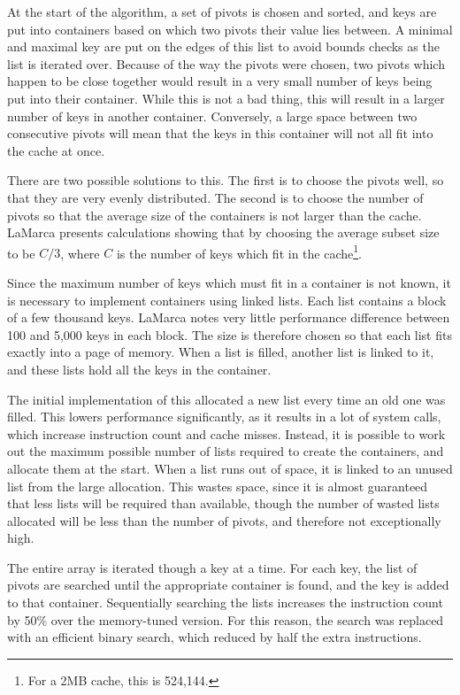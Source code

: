 At the start of the algorithm, a set of pivots is chosen and sorted, and keys
are put into containers based on which two pivots their value lies between. A
minimal and maximal key are put on the edges of this list to avoid bounds checks
as the list is iterated over. Because of the way the pivots were chosen, two
pivots which happen to be close together would result in a very small number of
keys being put into their container. While this is not a bad thing, this will
result in a larger number of keys in another container. Conversely, a large
space between two consecutive pivots will mean that the keys in this
container will not all fit into the cache at once.

There are two possible solutions to this. The first is to choose the pivots
well, so that they are very evenly distributed. The second is to choose the
number of pivots so that the average size of the containers is not larger than
the cache. LaMarca presents calculations showing that by choosing the average
subset size to be $C/3$, where $C$ is the number of keys which fit in the
cache\footnote{For a 2MB cache, this is 524,144.}.

Since the maximum number of keys which must fit in a container is not known, it
is necessary to implement containers using linked lists. Each list contains a
block of a few thousand keys. LaMarca notes very little performance difference
between 100 and 5,000 keys in each block. The size is therefore chosen so that
each list fits exactly into a page of memory. When a list is filled, another
list is linked to it, and these lists hold all the keys in the container.

The initial implementation of this allocated a new list every time an old one
was filled. This lowers performance significantly, as it results in a lot of
system calls, which increase instruction count and cache misses. Instead, it is
possible to work out the maximum possible number of lists required to create the
containers, and allocate them at the start. When a list runs out of space, it is
linked to an unused list from the large allocation. This wastes space, since it
is almost guaranteed that less lists will be required than available, though the
number of wasted lists allocated will be less than the number of pivots, and
therefore not exceptionally high.

The entire array is iterated though a key at a time. For each key, the list
of pivots are searched until the appropriate container is found, and the key is
added to that container. Sequentially searching the lists increases the
instruction count by 50\% over the memory-tuned version. For this reason, the
search was replaced with an efficient binary search, which reduced by half the
extra instructions.

